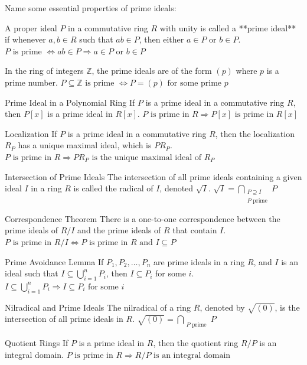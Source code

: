 Name some essential properties of prime ideals:


A proper ideal \( P \) in a commutative ring \( R \) with unity is called a **prime ideal** if whenever \( a, b \in R \) such that \( ab \in P \), then either \( a \in P \) or \( b \in P \).
\(
P \text{ is prime } \iff ab \in P \Rightarrow a \in P \text{ or } b \in P
\)

In the ring of integers \(\mathbb{Z}\), the prime ideals are of the form \( (p) \) where \( p \) is a prime number.
\(
P \subseteq \mathbb{Z} \text{ is prime } \iff P = (p) \text{ for some prime } p
\)

Prime Ideal in a Polynomial Ring
If \( P \) is a prime ideal in a commutative ring \( R \), then \( P[x] \) is a prime ideal in \( R[x] \).
\(
P \text{ is prime in } R \Rightarrow P[x] \text{ is prime in } R[x]
\)

Localization
If \( P \) is a prime ideal in a commutative ring \( R \), then the localization \( R_P \) has a unique maximal ideal, which is \( PR_P \).
\(
P \text{ is prime in } R \Rightarrow PR_P \text{ is the unique maximal ideal of } R_P
\)

Intersection of Prime Ideals
The intersection of all prime ideals containing a given ideal \( I \) in a ring \( R \) is called the radical of \( I \), denoted \( \sqrt{I} \).
\(
\sqrt{I} = \bigcap_{\substack{P \supseteq I \\ P \text{ prime}}} P
\)

Correspondence Theorem
There is a one-to-one correspondence between the prime ideals of \( R/I \) and the prime ideals of \( R \) that contain \( I \).
\(
P \text{ is prime in } R/I \iff P \text{ is prime in } R \text{ and } I \subseteq P
\)

Prime Avoidance Lemma
If \( P_1, P_2, \ldots, P_n \) are prime ideals in a ring \( R \), and \( I \) is an ideal such that \( I \subseteq \bigcup_{i=1}^n P_i \), then \( I \subseteq P_i \) for some \( i \).
\(
I \subseteq \bigcup_{i=1}^n P_i \Rightarrow I \subseteq P_i \text{ for some } i
\)

Nilradical and Prime Ideals
The nilradical of a ring \( R \), denoted by \( \sqrt{(0)} \), is the intersection of all prime ideals in \( R \).
\(
\sqrt{(0)} = \bigcap_{\substack{P \text{ prime}}} P
\)

Quotient Rings
If \( P \) is a prime ideal in \( R \), then the quotient ring \( R/P \) is an integral domain.
\(
P \text{ is prime in } R \Rightarrow R/P \text{ is an integral domain}
\)

